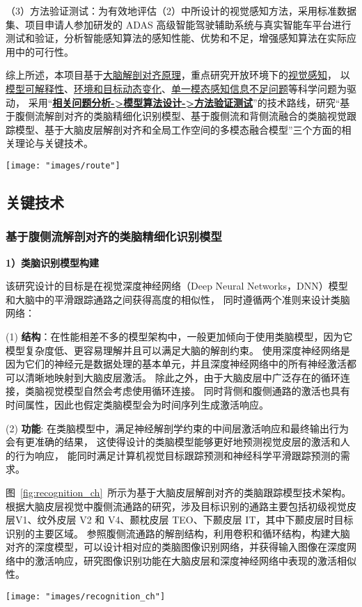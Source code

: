 \documentclass[a4paper,zihao=-4]{article}
\begin{document}
（3）方法验证测试：为有效地评估（2）中所设计的视觉感知方法，采用标准数据集、项目申请人参加研发的 ADAS 高级智能驾驶辅助系统与真实智能车平台进行测试和验证，分析智能感知算法的感知性能、优势和不足，增强感知算法在实际应用中的可行性。


综上所述，本项目基于\underline{大脑解剖对齐原理}，重点研究开放环境下的\underline{视觉感知}，
以\underline{模型可解释性}、\underline{环境和目标动态变化}、\underline{单一模态感知信息不足问题}等科学问题为驱动，
采用“\underline{\textbf{相关问题分析->模型算法设计->方法验证测试}}”的技术路线，研究“{基于腹侧流解剖对齐的类脑精细化识别模型}、{基于腹侧流和背侧流融合的类脑视觉跟踪模型}、{基于大脑皮层解剖对齐和全局工作空间的多模态融合模型}”三个方面的相关理论与关键技术。



\begin{figure*}[htb!]
	\centering  
	{\texttt{[image: "images/route"]}
	}
	\caption{本项目整体研究思路与关系}
	\label{fig:route}
\end{figure*}


\textcolor{NsfcBlue}{\subsection{关键技术}}

\subsubsection{基于腹侧流解剖对齐的类脑精细化识别模型}

\textbf{1）类脑识别模型构建}

该研究设计的目标是在视觉深度神经网络（Deep Neural Networks，DNN）模型和大脑中的平滑跟踪通路之间获得高度的相似性，
同时遵循两个准则来设计类脑网络：

(1) \textbf{结构}：在性能相差不多的模型架构中，一般更加倾向于使用类脑模型，因为它模型复杂度低、更容易理解并且可以满足大脑的解剖约束。
使用深度神经网络是因为它们的神经元是数据处理的基本单元，并且深度神经网络中的所有神经激活都可以清晰地映射到大脑皮层激活。
除此之外，由于大脑皮层中广泛存在的循环连接，类脑视觉模型自然会考虑使用循环连接。
同时背侧和腹侧通路的激活也具有时间属性，因此也假定类脑模型会为时间序列生成激活响应。

(2) \textbf{功能}: 
在类脑模型中，满足神经解剖学约束的中间层激活响应和最终输出行为会有更准确的结果，
这使得设计的类脑模型能够更好地预测视觉皮层的激活和人的行为响应，
能同时满足计算机视觉目标跟踪预测和神经科学平滑跟踪预测的需求。

图~\ref{fig:recognition_ch}~所示为基于大脑皮层解剖对齐的类脑跟踪模型技术架构。
根据大脑皮层视觉中腹侧流通路的研究，涉及目标识别的通路主要包括初级视觉皮层V1、纹外皮层 V2 和 V4、颞枕皮层 TEO、下颞皮层 IT，其中下颞皮层时目标识别的主要区域。
参照腹侧流通路的解剖结构，利用卷积和循环结构，构建大脑对齐的深度模型，可以设计相对应的类脑图像识别网络，并获得输入图像在深度网络中的激活响应，研究图像识别功能在大脑皮层和深度神经网络中表现的激活相似性。
\begin{figure*}[htb!]
	\centering  
	{\texttt{[image: "images/recognition\_ch"]}
	}
	\caption{ 基于大脑皮层解剖对齐的类脑跟踪模型的架构图}
	\label{fig:recognition_ch}
\end{figure*}
\end{document}
